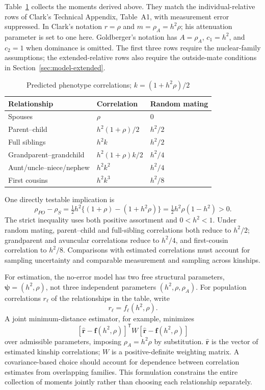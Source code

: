 Table~\ref{tab:notation} collects the moments derived above. They
match the individual-relative rows of Clark's Technical Appendix,
Table~A1, with measurement error suppressed. In Clark's notation
$r=\rho$ and $m=\rho_A=h^2\rho$; his attenuation parameter is set to
one here. Goldberger's notation has $A=\rho_A$, $c_1=h^2$, and $c_2=1$
when dominance is omitted. The first three rows require the nuclear-family
assumptions; the extended-relative rows also require the outside-mate
conditions in Section~\ref{sec:model-extended}.
\begin{table}[htbp]
\centering
\caption{Predicted phenotype correlations; $k=(1+h^2\rho)/2$}
\label{tab:notation}
\begin{tabular}{lll}
\hline
Relationship & Correlation & Random mating\\
\hline
Spouses & $\rho$ & $0$\\
Parent--child & $h^2(1+\rho)/2$ & $h^2/2$\\
Full siblings & $h^2k$ & $h^2/2$\\
Grandparent--grandchild & $h^2(1+\rho)k/2$ & $h^2/4$\\
Aunt/uncle--niece/nephew & $h^2k^2$ & $h^2/4$\\
First cousins & $h^2k^3$ & $h^2/8$\\
\hline
\end{tabular}
\end{table}

One directly testable implication is
\begin{equation}
 \rho_{PO}-\rho_S
 =\tfrac12h^2\{(1+\rho)-(1+h^2\rho)\}
 =\boxed{\tfrac12h^2\rho(1-h^2)>0}.
 \label{eq:gap}
\end{equation}
The strict inequality uses both positive assortment and
$0<h^2<1$. Under random mating, parent--child and full-sibling
correlations both reduce to $h^2/2$; grandparent and avuncular
correlations reduce to $h^2/4$, and first-cousin correlation to $h^2/8$.
Comparisons with estimated correlations must account for sampling
uncertainty and comparable measurement and sampling across kinships.

For estimation, the no-error model has two free structural parameters,
$\boldsymbol\psi=(h^2,\rho)$, not three independent parameters
$(h^2,\rho,\rho_A)$. For population correlations $r_\ell$ of the
relationships in the table, write
\[
 r_\ell=f_\ell(h^2,\rho).
\]
A joint minimum-distance estimator, for example, minimizes
\[
 [\widehat{\boldsymbol r}-\boldsymbol f(h^2,\rho)]^{\mathsf T}
 W[\widehat{\boldsymbol r}-\boldsymbol f(h^2,\rho)]
\]
over admissible parameters, imposing $\rho_A=h^2\rho$ by substitution.
$\widehat{\boldsymbol r}$ is the vector of estimated kinship correlations;
$W$ is a positive-definite weighting matrix. A covariance-based choice
should account for dependence between correlation estimates from
overlapping families. This formulation constrains the entire collection
of moments jointly rather than choosing each relationship separately.

